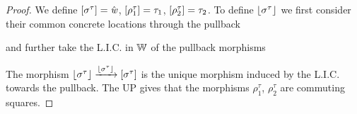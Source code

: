 \begin{proof}
    We define $[\sigma^\tau] = \hat{\mathit{w}}$, $[\rho^\tau_1] = \tau_1$, $[\rho^\tau_2] = \tau_2$.
    To define $\lfloor\sigma^\tau\rfloor$ we first consider their common concrete locations through the pullback
    \begin{center}
    \end{center}
    and further take the L.I.C. in $\mathbb{W}$ of the pullback morphisms
    \begin{center}
    \end{center}
    The morphism $\lfloor\sigma^\tau\rfloor \xrightarrow{\lfloor\sigma^\tau\rfloor} [\sigma^\tau]$ is the unique morphism induced by the L.I.C. towards the pullback. 
    The UP gives that the morphisms $\rho^\tau_1$, $\rho^\tau_2$ are commuting squares.


\end{proof}
